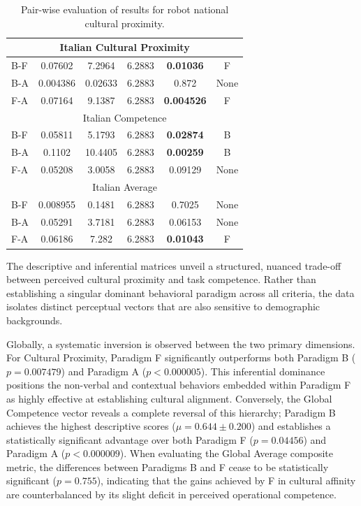 \begin{table}
\begin{tabular}{lccccc}
\midrule
\multicolumn{6}{c}{Italian Cultural Proximity} \\
\midrule
B-F & 0.07602 & 7.2964 & 6.2883 & \textbf{0.01036}& F \\
B-A & 0.004386 & 0.02633 & 6.2883 & 0.872& None \\
F-A & 0.07164 & 9.1387 & 6.2883 & \textbf{0.004526}& F \\
\midrule
\multicolumn{6}{c}{Italian Competence} \\
\midrule
B-F & 0.05811 & 5.1793 & 6.2883 & \textbf{0.02874}& B \\
B-A & 0.1102 & 10.4405 & 6.2883 & \textbf{0.00259}& B \\
F-A & 0.05208 & 3.0058 & 6.2883 & 0.09129& None\\
\midrule
\multicolumn{6}{c}{Italian Average} \\
\midrule
B-F & 0.008955 & 0.1481 & 6.2883 & 0.7025& None \\
B-A & 0.05291 & 3.7181 & 6.2883 & 0.06153& None \\
F-A & 0.06186 & 7.282 & 6.2883 & \textbf{0.01043}& F \\
\bottomrule
\end{tabular}
\caption{Pair-wise evaluation of results for robot national cultural proximity.}
\label{tab:significance_stats}
\end{table}

The descriptive and inferential matrices unveil a structured, nuanced trade-off between perceived cultural proximity and task competence. 
Rather than establishing a singular dominant behavioral paradigm across all criteria, the data isolates distinct perceptual vectors that are also sensitive to demographic backgrounds. 

Globally, a systematic inversion is observed between the two primary dimensions. 
For Cultural Proximity, Paradigm F significantly outperforms both Paradigm B ($p = 0.007479$) and Paradigm A ($p < 0.000005$). 
This inferential dominance positions the non-verbal and contextual behaviors embedded within Paradigm F as highly effective at establishing cultural alignment. 
Conversely, the Global Competence vector reveals a complete reversal of this hierarchy; Paradigm B achieves the highest descriptive scores ($\mu = 0.644 \pm 0.200$) and establishes a statistically significant advantage over both Paradigm F ($p = 0.04456$) and Paradigm A ($p < 0.000009$). 
When evaluating the Global Average composite metric, the differences between Paradigms B and F cease to be statistically significant ($p = 0.755$), indicating that the gains achieved by F in cultural affinity are counterbalanced by its slight deficit in perceived operational competence.

